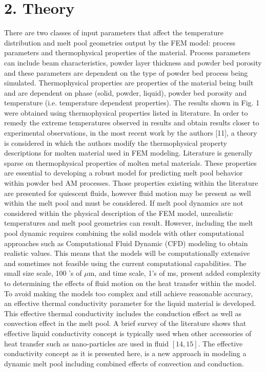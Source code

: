\documentclass[10pt]{article}
\begin{document}
\section*{2. Theory}
There are two classes of input parameters that affect the temperature distribution and melt pool geometries output by the FEM model: process parameters and thermophysical properties of the material. Process parameters can include beam characteristics, powder layer thickness and powder bed porosity and these parameters are dependent on the type of powder bed process being simulated. Thermophysical properties are properties of the material being built and are dependent on phase (solid, powder, liquid), powder bed porosity and temperature (i.e. temperature dependent properties). The results shown in Fig. 1 were obtained using thermophysical properties listed in literature. In order to remedy the extreme temperatures observed in results and obtain results closer to experimental observations, in the most recent work by the authors [11], a theory is considered in which the authors modify the thermophysical property descriptions for molten material used in FEM modeling. Literature is generally sparse on thermophysical properties of molten metal materials. These properties are essential to developing a robust model for predicting melt pool behavior within powder bed AM processes. Those properties existing within the literature are presented for quiescent fluids, however fluid motion may be present as well within the melt pool and must be considered. If melt pool dynamics are not considered within the physical description of the FEM model, unrealistic temperatures and melt pool geometries can result. However, including the melt pool dynamic requires combining the solid models with other computational approaches such as Computational Fluid Dynamic (CFD) modeling to obtain realistic values. This means that the models will be computationally extensive and sometimes not feasible using the current computational capabilities. The small size scale, 100 's of $\mu \mathrm{m}$, and time scale, 1's of ms, present added complexity to determining the effects of fluid motion on the heat transfer within the model. To avoid making the models too complex and still achieve reasonable accuracy, an effective thermal conductivity parameter for the liquid material is developed. This effective thermal conductivity includes the conduction effect as well as convection effect in the melt pool. A brief survey of the literature shows that effective liquid conductivity concept is typically used when other accessories of heat transfer such as nano-particles are used in fluid $[14,15]$. The effective conductivity concept as it is presented here, is a new approach in modeling a dynamic melt pool including combined effects of convection and conduction.
\end{document}
